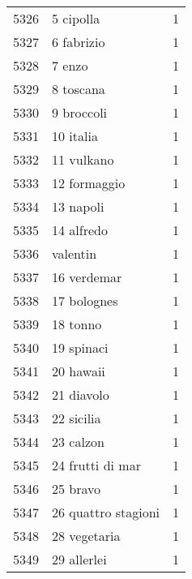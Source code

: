 \begin{tabular}{llr}
5326 &                                          5 cipolla &      1 \\
5327 &                                         6 fabrizio &      1 \\
5328 &                                             7 enzo &      1 \\
5329 &                                          8 toscana &      1 \\
5330 &                                         9 broccoli &      1 \\
5331 &                                          10 italia &      1 \\
5332 &                                         11 vulkano &      1 \\
5333 &                                       12 formaggio &      1 \\
5334 &                                          13 napoli &      1 \\
5335 &                                         14 alfredo &      1 \\
5336 &                                           valentin &      1 \\
5337 &                                        16 verdemar &      1 \\
5338 &                                        17 bolognes &      1 \\
5339 &                                           18 tonno &      1 \\
5340 &                                         19 spinaci &      1 \\
5341 &                                          20 hawaii &      1 \\
5342 &                                         21 diavolo &      1 \\
5343 &                                         22 sicilia &      1 \\
5344 &                                          23 calzon &      1 \\
5345 &                                   24 frutti di mar &      1 \\
5346 &                                           25 bravo &      1 \\
5347 &                                26 quattro stagioni &      1 \\
5348 &                                       28 vegetaria &      1 \\
5349 &                                        29 allerlei &      1 \\

\end{tabular}
